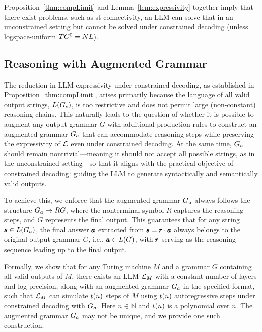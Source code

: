 Proposition~\ref{thm:compLimit} and Lemma~\ref{lem:expressivity} together imply that there exist problems, such as st-connectivity, an LLM can solve that in an unconstrained setting but cannot be solved under constrained decoding (unless logspace-uniform $TC^{0} = NL$).

\subsection{Reasoning with Augmented Grammar}
The reduction in LLM expressivity under constrained decoding, as established in Proposition~\ref{thm:compLimit}, arises primarily because the language of all valid output strings, $ L(G_c) $, is too restrictive and does not permit large (non-constant) reasoning chains. This naturally leads to the question of whether it is possible to augment any output grammar $G$ with additional production rules to construct an augmented grammar $G_a$ that can accommodate reasoning steps while preserving the expressivity of $\mathcal{L}{}$ even under constrained decoding. At the same time, $G_a$ should remain nontrivial—meaning it should not accept all possible strings, as in the unconstrained setting—so that it aligns with the practical objective of constrained decoding: guiding the LLM to generate syntactically and semantically valid outputs.

To achieve this, we enforce that the augmented grammar $ G_a $ always follows the structure $ G_a \to RG $, where the nonterminal symbol $ R $ captures the reasoning steps, and $ G $ represents the final output. This guarantees that for any string $ \pmb{s} \in L(G_a) $, the final answer $ \pmb{a} $ extracted from $ \pmb{s} = \pmb{r} \cdot \pmb{a} $ always belongs to the original output grammar $ G $, i.e., $ \pmb{a} \in L(G) $, with $ \pmb{r} $ serving as the reasoning sequence leading up to the final output.  

Formally, we show that for any Turing machine $ M $ and a grammar $ G $ containing all valid outputs of $ M $, there exists an LLM $ \mathcal{L}{}_{M} $ with a constant number of layers and log-precision, along with an augmented grammar $ G_a $ in the specified format, such that $ \mathcal{L}_M $ can simulate $ t(n) $ steps of $ M $ using $t(n)$ autoregressive steps under constrained decoding with $ G_a $. Here $n \in \mathbb{N}$ and $t(n)$ is a polynomial over $n$. The augmented grammar $ G_a$ may not be unique, and we provide one such construction. 

